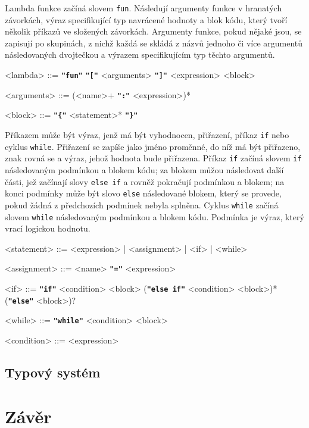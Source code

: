 \documentclass[a4paper,12pt]{article}
\def\emphasis #1{\textbf{\texttt{"#1"}}}
\begin{document}
Lambda funkce začíná slovem \texttt{fun}. Následují argumenty funkce v hranatých závorkách, výraz specifikující typ navrácené hodnoty a blok kódu, který tvoří několik příkazů ve složených závorkách. Argumenty funkce, pokud nějaké jsou, se zapisují po skupinách, z nichž každá se skládá z názvů jednoho či více argumentů následovaných dvojtečkou a výrazem specifikujícím typ těchto argumentů.
\begin{grammar}
<lambda> ::= \emphasis{fun} \emphasis{[} <arguments> \emphasis{]} <expression> <block>

<arguments> ::= (<name>+ \emphasis{:} <expression>)*

<block> ::= \emphasis{\{} <statement>* \emphasis{\}}
\end{grammar}

Příkazem může být výraz, jenž má být vyhodnocen, přiřazení, příkaz \texttt{if} nebo cyklus \texttt{while}. Přiřazení se zapíše jako jméno proměnné, do níž má být přiřazeno, znak rovná se a výraz, jehož hodnota bude přiřazena. Příkaz \texttt{if} začíná slovem \texttt{if} následovaným podmínkou a blokem kódu; za blokem můžou následovat další části, jež začínají slovy \texttt{else if} a rovněž pokračují podmínkou a blokem; na konci podmínky může být slovo \texttt{else} následované blokem, který se provede, pokud žádná z předchozích podmínek nebyla splněna. Cyklus \texttt{while} začíná slovem \texttt{while} následovaným podmínkou a blokem kódu. Podmínka je výraz, který vrací logickou hodnotu.
\begin{grammar}
<statement> ::= <expression> | <assignment> | <if> | <while>

<assignment> ::= <name> \emphasis{=} <expression>

<if> ::= \emphasis{if} <condition> <block> (\emphasis{else if} <condition> <block>)* (\emphasis{else} <block>)?

<while> ::= \emphasis{while} <condition> <block>

<condition> ::= <expression>
\end{grammar}

\subsection{Typový systém}

\section{Závěr}

\newpage
\printbibliography[heading=bibintoc, title={Použitá literatura}]
\newpage
\end{document}
